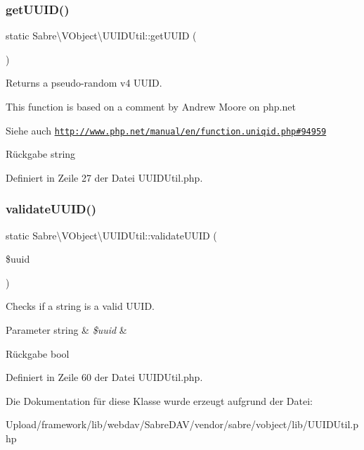 \subsubsection{\texorpdfstring{get\+U\+U\+I\+D()}{getUUID()}}
{\footnotesize\ttfamily static Sabre\textbackslash{}\+V\+Object\textbackslash{}\+U\+U\+I\+D\+Util\+::get\+U\+U\+ID (\begin{DoxyParamCaption}{ }\end{DoxyParamCaption})\hspace{0.3cm}{\ttfamily [static]}}

Returns a pseudo-\/random v4 U\+U\+ID.

This function is based on a comment by Andrew Moore on php.\+net

\begin{DoxySeeAlso}{Siehe auch}
\href{http://www.php.net/manual/en/function.uniqid.php#94959}{\tt http\+://www.\+php.\+net/manual/en/function.\+uniqid.\+php\#94959}
\end{DoxySeeAlso}
\begin{DoxyReturn}{Rückgabe}
string 
\end{DoxyReturn}


Definiert in Zeile 27 der Datei U\+U\+I\+D\+Util.\+php.

\mbox{\label{class_sabre_1_1_v_object_1_1_u_u_i_d_util_a8a97d40a9a52cad0b33fe4cc22507655}} 
\subsubsection{\texorpdfstring{validate\+U\+U\+I\+D()}{validateUUID()}}
{\footnotesize\ttfamily static Sabre\textbackslash{}\+V\+Object\textbackslash{}\+U\+U\+I\+D\+Util\+::validate\+U\+U\+ID (\begin{DoxyParamCaption}\item[{}]{\$uuid }\end{DoxyParamCaption})\hspace{0.3cm}{\ttfamily [static]}}

Checks if a string is a valid U\+U\+ID.


\begin{DoxyParams}[1]{Parameter}
string & {\em \$uuid} & \\
\hline
\end{DoxyParams}
\begin{DoxyReturn}{Rückgabe}
bool 
\end{DoxyReturn}


Definiert in Zeile 60 der Datei U\+U\+I\+D\+Util.\+php.



Die Dokumentation für diese Klasse wurde erzeugt aufgrund der Datei\+:\begin{DoxyCompactItemize}
\item 
Upload/framework/lib/webdav/\+Sabre\+D\+A\+V/vendor/sabre/vobject/lib/U\+U\+I\+D\+Util.\+php\end{DoxyCompactItemize}
